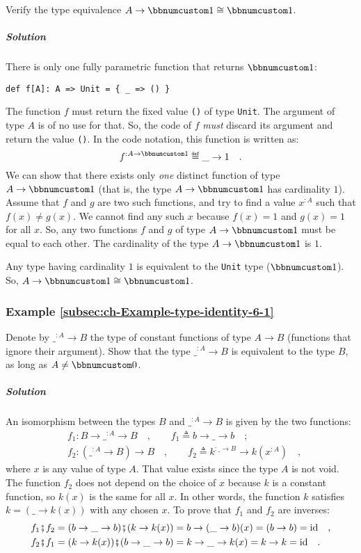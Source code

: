 Verify the type equivalence $A\rightarrow\bbnum 1\cong\bbnum 1$.

\subparagraph{Solution}

There is only one fully parametric function that returns $\bbnum 1$:
\begin{lstlisting}
def f[A]: A => Unit = { _ => () }
\end{lstlisting}
The function $f$ must return the fixed value \lstinline!()! of type
\lstinline!Unit!. The argument of type $A$ is of no use for that.
So, the code of $f$ \emph{must} discard its argument and return the
value \lstinline!()!. In the code notation, this function is written
as:
\[
f^{:A\rightarrow\bbnum 1}\triangleq\_\rightarrow1\quad.
\]
We can show that there exists only \emph{one} distinct function of
type $A\rightarrow\bbnum 1$ (that is, the type $A\rightarrow\bbnum 1$
has cardinality $1$). Assume that $f$ and $g$ are two such functions,
and try to find a value $x^{:A}$ such that $f(x)\neq g(x)$. We cannot
find any such $x$ because $f(x)=1$ and $g(x)=1$ for all $x$. So,
any two functions $f$ and $g$ of type $A\rightarrow\bbnum 1$ must
be equal to each other. The cardinality of the type $A\rightarrow\bbnum 1$
is $1$.

Any type having cardinality $1$ is equivalent to the \lstinline!Unit!
type ($\bbnum 1$). So, $A\rightarrow\bbnum 1\cong\bbnum 1$.

\subsubsection{Example \label{subsec:ch-Example-type-identity-6-1}\ref{subsec:ch-Example-type-identity-6-1}}

Denote by $\_^{:A}\rightarrow B$ the type of constant
functions of type $A\rightarrow B$ (functions that ignore their argument).
Show that the type $\_^{:A}\rightarrow B$ is equivalent to the type
$B$, as long as $A\neq\bbnum 0$.

\subparagraph{Solution}

An isomorphism between the types $B$ and $\_^{:A}\rightarrow B$
is given by the two functions:
\begin{align*}
 & f_{1}:B\rightarrow\_^{:A}\rightarrow B\quad,\quad\quad f_{1}\triangleq b\rightarrow\_\rightarrow b\quad;\\
 & f_{2}:(\_^{:A}\rightarrow B)\rightarrow B\quad,\quad\quad f_{2}\triangleq k^{:\_\rightarrow B}\rightarrow k(x^{:A})\quad,
\end{align*}
where $x$ is any value of type $A$. That value exists since the
type $A$ is not void. The function $f_{2}$ does not depend on the
choice of $x$ because $k$ is a constant function, so $k(x)$ is
the same for all $x$. In other words, the function $k$ satisfies
$k=(\_\rightarrow k(x))$ with any chosen $x$. To prove that $f_{1}$
and $f_{2}$ are inverses:
\begin{align*}
 & f_{1}\bef f_{2}=(b\rightarrow\_\rightarrow b)\bef(k\rightarrow k(x))=b\rightarrow(\_\rightarrow b)(x)=(b\rightarrow b)=\text{id}\quad,\\
 & f_{2}\bef f_{1}=(k\rightarrow k(x))\bef(b\rightarrow\_\rightarrow b)=k\rightarrow\_\rightarrow k(x)=k\rightarrow k=\text{id}\quad.
\end{align*}


